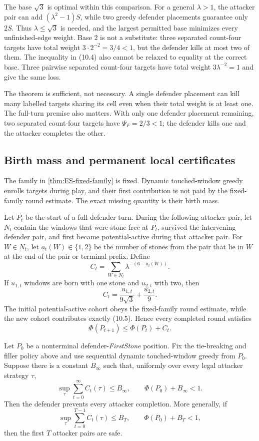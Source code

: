 The base $\sqrt3$ is optimal within this comparison.  For a general
$\lambda>1$, the attacker pair can add $(\lambda^2-1)S$, while two greedy
defender placements guarantee only $2S$.  Thus $\lambda\leq\sqrt3$ is needed,
and the largest permitted base minimizes every unfinished-edge weight.  Base
$2$ is not a substitute: three separated count-four targets have total weight
$3\cdot2^{-2}=3/4<1$, but the defender kills at most two of them.  The
inequality in \textup{(10.4)} also cannot be relaxed to equality at the correct
base.  Three pairwise separated count-four targets have total weight
$3\lambda^{-2}=1$ and give the same loss.

The theorem is sufficient, not necessary.  A single defender placement can
kill many labelled targets sharing its cell even when their total weight is at
least one.  The full-turn premise also matters.  With only one defender
placement remaining, two separated count-four targets have
$\Psi_F=2/3<1$; the defender kills one and the attacker completes the other.

\subsection{Birth mass and permanent local certificates}

The family in \cref{thm:ES-fixed-family} is fixed.  Dynamic touched-window
greedy enrolls targets during play, and their first contribution is not paid
by the fixed-family round estimate.  The exact missing quantity is their birth
mass.

Let $P_t$ be the start of a full defender turn.  During the following attacker
pair, let $N_t$ contain the windows that were stone-free at $P_t$, survived the
 intervening defender pair, and first became potential-active during that attacker
pair.  For $W\in N_t$, let $a_t(W)\in\{1,2\}$ be the number of stones from the
pair that lie in $W$ at the end of the pair or terminal prefix.  Define
\[
 C_t=\sum_{W\in N_t}\lambda^{-(6-a_t(W))}.
\tag{10.5}
\]
If $u_{1,t}$ windows are born with one stone and $u_{2,t}$ with two, then
\[
 C_t=\frac{u_{1,t}}{9\sqrt3}+\frac{u_{2,t}}9.
\]
The initial potential-active cohort obeys the fixed-family round estimate, while the new
cohort contributes exactly \textup{(10.5)}.  Hence every completed round
satisfies
\[
 \Phi(P_{t+1})\leq\Phi(P_t)+C_t.
\tag{10.6}
\]

\begin{theorem}
\label{thm:ES-cumulative}
Let $P_0$ be a nonterminal defender-\emph{FirstStone} position.  Fix the
tie-breaking and filler policy above and use sequential dynamic touched-window
greedy from $P_0$.  Suppose there is a constant $B_\infty$ such that, uniformly
over every legal attacker strategy $\tau$,
\[
 \sup_\tau\sum_{t=0}^{\infty}C_t(\tau)\leq B_\infty,
 \qquad \Phi(P_0)+B_\infty<1.
\tag{10.7}
\]
Then the defender prevents every attacker completion.  More generally, if
\[
 \sup_\tau\sum_{t=0}^{T-1}C_t(\tau)\leq B_T,
 \qquad \Phi(P_0)+B_T<1,
\tag{10.8}
\]
then the first $T$ attacker pairs are safe.
\end{theorem}

